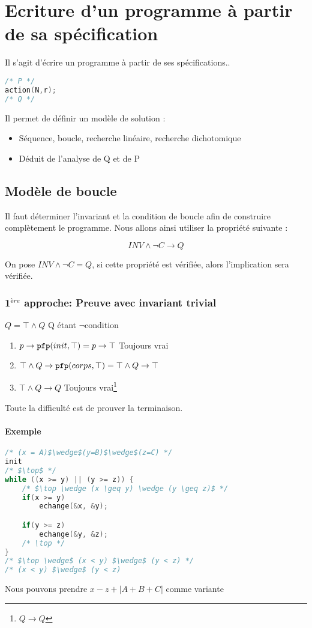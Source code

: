 \chapter{Ecriture d'un programme à partir de sa spécification}
Il s'agit d'écrire un programme à partir de ses spécifications..
\begin{lstlisting}[language=C, numbers=none]
/* P */
action(N,r);
/* Q */
\end{lstlisting}
Il permet de définir un modèle de solution : 
\begin{itemize}
	\item Séquence, boucle, recherche linéaire, recherche dichotomique
	\item Déduit de l'analyse de Q et de P
\end{itemize}

\section{Modèle de boucle}
	Il faut déterminer l'invariant et la condition de boucle afin de construire complètement le programme. Nous allons ainsi utiliser la propriété suivante : 

	$$ INV \wedge \neg C \rightarrow Q $$

	On pose $INV \wedge \neg C = Q$, si cette propriété est vérifiée, alors l'implication sera vérifiée.

	\subsection{1$^{ère}$ approche: Preuve avec invariant trivial}
	$Q = \top \wedge Q$ Q étant $\neg$condition 
	\begin{enumerate}
		\item $p \rightarrow \pfp (init , \top) = p \rightarrow \top$ Toujours vrai
		\item $\top \wedge Q \rightarrow \pfp(corps, \top) = \top \wedge Q \rightarrow \top$
		\item $\top \wedge Q \rightarrow Q$ Toujours vrai\footnote{$Q\rightarrow Q$} 
	\end{enumerate}
	Toute la difficulté est de prouver la terminaison.
	\subsubsection{Exemple}
	\begin{lstlisting}[language=C]
/* (x = A)$\wedge$(y=B)$\wedge$(z=C) */
init
/* $\top$ */
while ((x >= y) || (y >= z)) {
	/* $\top \wedge (x \geq y) \wedge (y \geq z)$ */
	if(x >= y) 
		echange(&x, &y);

	if(y >= z) 
		echange(&y, &z);
	/* \top */
}
/* $\top \wedge$ (x < y) $\wedge$ (y < z) */
/* (x < y) $\wedge$ (y < z)
	\end{lstlisting}
	Nous pouvons prendre $x-z + |A+B+C|$ comme variante


